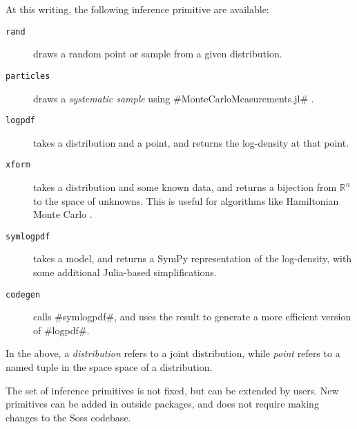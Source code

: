 \documentclass[anonymous=false, %
               format=acmsmall, %
               review=false, %
               screen=true, %
               nonacm=true]{acmart}
\begin{document}
At this writing, the following inference primitive are available:

\begin{description}
    \item[\texttt{rand}] draws a random point or sample from a given distribution.
    \item[\texttt{particles}] draws a \emph{systematic sample} using \jl#MonteCarloMeasurements.jl# \cite{bagge2020MCM.jl}.
    \item[\texttt{logpdf}] takes a distribution and a point, and returns the log-density at that point.
    \item[\texttt{xform}] takes a distribution and some known data, and returns a bijection from $\mathbb{R}^n$ to the space of unknowns. This is useful for algorithms like Hamiltonian Monte Carlo \cite{Neal2011}.
    \item[\texttt{symlogpdf}] takes a model, and returns a SymPy \cite{10.7717/peerj-cs.103} representation of the log-density, with some additional Julia-based simplifications.
    \item[\texttt{codegen}] calls \jl#symlogpdf#, and uses the result to generate a more efficient version of \jl#logpdf#.
\end{description}

In the above, a \emph{distribution} refers to a joint distribution, while \emph{point} refers to a named tuple in the space space of a distribution.

The set of inference primitives is not fixed, but can be extended by users. New primitives can be added in outside packages, and does not require making changes to the Soss codebase. 
\end{document}
